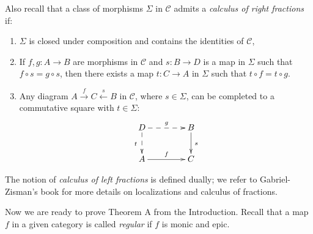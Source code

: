 \documentclass[oneside, a4paper,reqno]{amsart}
\numberwithin{equation}{section}
\theoremstyle{definition}
\begin{document}
Also recall that a class of morphisms $\Sigma$ in ${\mathscr C}$ admits a {\em calculus of right fractions} if:
\begin{enumerate}
\item $\Sigma$ is closed under composition and contains the identities of ${\mathscr C}$,
\item If $f,g \colon A {\longrightarrow} B$ are morphisms in ${\mathscr C}$ and $s \colon B {\longrightarrow} D$ is a map in $\Sigma$ such that $f \circ s = g \circ s$, then there exists a map $t \colon C {\longrightarrow} A$ in $\Sigma$ such that $t \circ f = t\circ g$. 
\item Any diagram $A \stackrel{f}{\longrightarrow} C \stackrel{s}{\longleftarrow} B$ in 
${\mathscr C}$, where $s \in \Sigma$, can be completed to a commutative square with $t \in \Sigma$:
\[
\xymatrix@C=1.5cm{
  D \ar@{-->}[d]_{t \,\, } \ar@{-->}[r]^{g}  & B \ar[d]^{\, s}  \\
  A \ar[r]^{f} &  C  } 
\] 
\end{enumerate}

The notion of {\em calculus of left fractions} is defined dually;  we refer to Gabriel-Zisman's book \cite{GZ} for more details on localizations and calculus of fractions. 

Now we are ready to prove Theorem A from the Introduction. Recall that a map $f$ in a given category is called {\em regular} if $f$ is monic and epic.    
 
    
\end{document}
